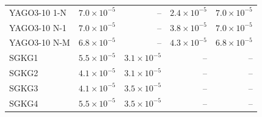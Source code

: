 \begin{tabular}{lrrrr}
YAGO3-10 1-N & $7.0\times10^{-5}$ & – & $2.4\times10^{-5}$ & $7.0\times10^{-5}$ \\
YAGO3-10 N-1 & $7.0\times10^{-5}$ & – & $3.8\times10^{-5}$ & $7.0\times10^{-5}$ \\
YAGO3-10 N-M & $6.8\times10^{-5}$ & – & $4.3\times10^{-5}$ & $6.8\times10^{-5}$ \\
\midrule
SGKG1 & $5.5\times10^{-5}$ & $3.1\times10^{-5}$ & – & – \\
SGKG2 & $4.1\times10^{-5}$ & $3.1\times10^{-5}$ & – & – \\
SGKG3 & $4.1\times10^{-5}$ & $3.5\times10^{-5}$ & – & – \\
SGKG4 & $5.5\times10^{-5}$ & $3.5\times10^{-5}$ & – & – \\
\bottomrule
\end{tabular}

